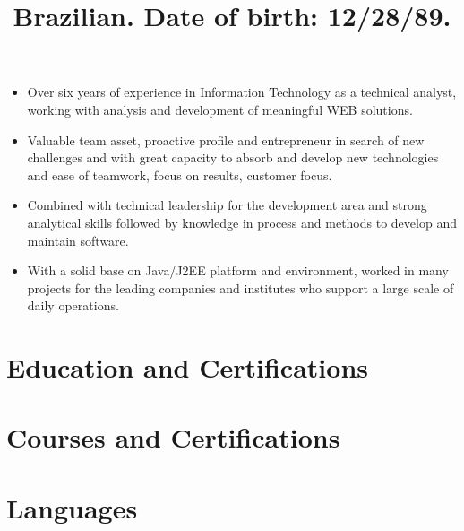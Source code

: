 \documentclass[12pt,a4paper]{moderncv}
\title{\small Brazilian. Date of birth: 12/28/89.}
\begin{document}
\makecvtitle

\begin{itemize}
    \item Over six years of experience in Information Technology as a technical analyst, working with analysis and development of meaningful WEB solutions.
    \item Valuable team asset, proactive profile and entrepreneur in search of new challenges and with great capacity to absorb and develop new technologies and ease of teamwork, focus on results, customer focus.
    \item Combined with technical leadership for the development area and strong analytical skills followed by knowledge in process and methods to develop and maintain software.
    \item With a solid base on Java/J2EE platform and environment, worked in many projects for the leading companies and institutes who support a large scale of daily operations.
\end{itemize}

\section{Education and Certifications}

\section{Courses and Certifications}

\newpage
\section{Languages}
\end{document}
